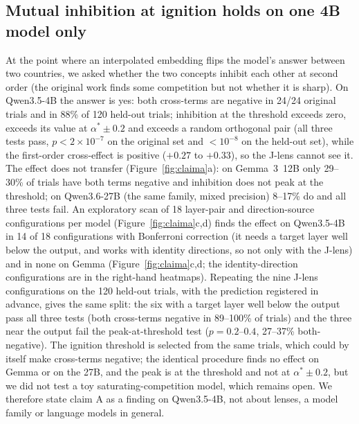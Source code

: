 \documentclass[10pt]{article}
\newcommand{\figref}[1]{Figure~\ref{#1}}
\begin{document}
\subsection{Mutual inhibition at ignition holds on one 4B model only}
\label{sec:claima}
At the point where an interpolated embedding flips the model's answer between two countries, we asked whether the two concepts inhibit each other at second order (the original work finds some competition but not whether it is sharp). On Qwen3.5-4B the answer is yes: both cross-terms are negative in 24/24 original trials and in 88\% of 120 held-out trials; inhibition at the threshold exceeds zero, exceeds its value at $\alpha^*\pm0.2$ and exceeds a random orthogonal pair (all three tests pass, $p<2\times10^{-7}$ on the original set and $<10^{-8}$ on the held-out set), while the first-order cross-effect is positive ($+0.27$ to $+0.33$), so the J-lens cannot see it. The effect does not transfer (\figref{fig:claima}a): on Gemma~3~12B only 29--30\% of trials have both terms negative and inhibition does not peak at the threshold; on Qwen3.6-27B (the same family, mixed precision) 8--17\% do and all three tests fail. An exploratory scan of 18 layer-pair and direction-source configurations per model (\figref{fig:claima}c,d) finds the effect on Qwen3.5-4B in 14 of 18 configurations with Bonferroni correction (it needs a target layer well below the output, and works with identity directions, so not only with the J-lens) and in none on Gemma (\figref{fig:claima}c,d; the identity-direction configurations are in the right-hand heatmaps). Repeating the nine J-lens configurations on the 120 held-out trials, with the prediction registered in advance, gives the same split: the six with a target layer well below the output pass all three tests (both cross-terms negative in 89--100\% of trials) and the three near the output fail the peak-at-threshold test ($p=0.2$--$0.4$, 27--37\% both-negative). The ignition threshold is selected from the same trials, which could by itself make cross-terms negative; the identical procedure finds no effect on Gemma or on the 27B, and the peak is at the threshold and not at $\alpha^*\pm0.2$, but we did not test a toy saturating-competition model, which remains open. We therefore state claim A as a finding on Qwen3.5-4B, not about lenses, a model family or language models in general.
\end{document}
